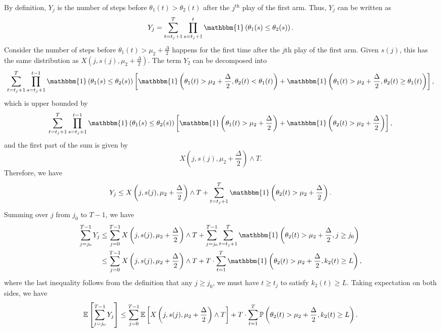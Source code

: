 \documentclass[letterpaper,11pt]{article}
\begin{document}
By definition, $Y_j$ is the number of steps before $\theta_1(t) > \theta_2(t)$ after the $j^{\text{th}}$ play of the first arm. 
Thus, $Y_j$ can be written as
\begin{equation*}
    Y_j = \sum_{t = t_j+1}^T \prod_{s=t_{j}+1}^t \mathbbm{1}\left(\theta_1(s) \leq \theta_2(s)\right).
\end{equation*}
Consider the number of steps before $\theta_1(t) > \mu_2 + \frac{\Delta}{2}$ happens for the first time after the $j$th play of the first arm. 
Given $s(j)$, this has the same distribution as $X(j, s(j), \mu_2 + \frac{\Delta}{2})$. 
The term $Y_2$ can be decomposed into
\begin{equation*}
    \sum_{t = t_j+1}^T \prod_{s=t_{j}+1}^{t-1} \mathbbm{1}\left(\theta_1(s) \leq \theta_2(s)\right) \left[ \mathbbm{1}\left(\theta_1(t) > \mu_2 + \frac{\Delta}{2}, \theta_2(t) < \theta_1(t)\right) + \mathbbm{1}\left(\theta_1(t) > \mu_2 + \frac{\Delta}{2}, \theta_2(t) \geq \theta_1(t)\right)\right],
\end{equation*}
which is upper bounded by
\begin{equation*}
    \sum_{t = t_j+1}^T \prod_{s=t_{j}+1}^{t-1} \mathbbm{1}\left(\theta_1(s) \leq \theta_2(s)\right) \left[ \mathbbm{1}\left(\theta_1(t) > \mu_2 + \frac{\Delta}{2}\right) + \mathbbm{1}\left(\theta_2(t) > \mu_2 + \frac{\Delta}{2}\right)\right],
\end{equation*}
and the first part of the sum is given by 
\begin{equation*}
    X\left(j, s(j), \mu_2 + \frac{\Delta}{2}\right) \wedge T. 
\end{equation*}
Therefore, we have
\begin{equation*}
    Y_j \leq X\left(j, s(j), \mu_2 + \frac{\Delta}{2}\right) \wedge T + \sum_{t=t_j+1}^T \mathbbm{1}\left(\theta_2(t) > \mu_2 + \frac{\Delta}{2}\right). 
\end{equation*}
Summing over $j$ from $j_0$ to $T-1$, we have
\begin{equation*}
\begin{aligned}
    \sum_{j=j_0}^{T-1} Y_j &\leq \sum_{j=0}^{T-1} X\left(j, s(j), \mu_2 + \frac{\Delta}{2}\right) \wedge T + \sum_{j=j_0}^{T-1} \sum_{t=t_j+1}^T \mathbbm{1}\left(\theta_2(t) > \mu_2 + \frac{\Delta}{2}, j \geq j_0\right)\\
    &\leq \sum_{j=0}^{T-1} X\left(j, s(j), \mu_2 + \frac{\Delta}{2}\right) \wedge T + T \cdot \sum_{t=1}^T \mathbbm{1}\left(\theta_2(t) > \mu_2 + \frac{\Delta}{2}, k_2(t) \geq L\right),
\end{aligned}
\end{equation*}
where the last inequality follows from the definition that any $j \geq j_0$, we must have $t \geq t_j$ to satisfy $k_2(t) \geq L$. 
Taking expectation on both sides, we have
\begin{equation*}
    \mathbb{E} \left[\sum_{j=j_0}^{T-1} Y_j\right] \leq \sum_{j=0}^{T-1} \mathbb{E} \left[ X\left(j, s(j), \mu_2 + \frac{\Delta}{2}\right) \wedge T \right] + T \cdot \sum_{t=1}^T \mathbb{P}\left(\theta_2(t) > \mu_2 + \frac{\Delta}{2}, k_2(t) \geq L\right).
\end{equation*}
\end{document}
